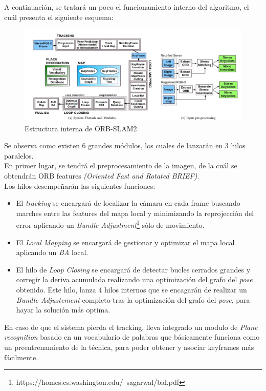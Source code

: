 A continuación, se tratará un poco el funcionamiento interno del algoritmo, el cuál presenta el siguiente esquema:
\begin{figure}[h!]
    \centering
    \includegraphics[width=1\textwidth]{images/orb_scheme}
    \caption{Estructura interna de ORB-SLAM2}
\end{figure}

Se observa como existen 6 grandes módulos, los cuales de lanzarán en 3 hilos paralelos. \\
En primer lugar, se tendrá el preprocesamiento de la imagen, de la cuál se obtendrán  ORB features 
\textit{(Oriented Fast and Rotated BRIEF)}. \\
Los hilos desempeñarán las siguientes funciones:
\begin{itemize}
    \item El \textit{tracking} se encargará de localizar la cámara en cada frame buscando marches entre las features
    del mapa local y minimizando la reprojección del error aplicando un \textit{Bundle Adjustment}\footnote{https://homes.cs.washington.edu/~sagarwal/bal.pdf} sólo de 
    movimiento.
    \item El \textit{Local Mapping} se encargará de gestionar y optimizar el mapa local aplicando un \textit{BA} local.
    \item El hilo de \textit{Loop Closing} se encargará de detectar bucles cerrados grandes y corregir la deriva acumulada
    realizando una optimización del grafo del \textit{pose} obtenido. Este hilo, lanza 4 hilos internos que se encagarán de
    realizar un \textit{Bundle Adjustement} completo tras la optimización del grafo del \textit{pose}, para hayar la solución
    más optima.
\end{itemize}

En caso de que el sistema pierda el tracking, lleva integrado un modulo de \textit{Plane recognition} basado en un vocabulario 
de palabras que básicamente funciona como un preentrenamiento de la técnica, para poder obtener y asociar keyframes más fácilmente. \\

